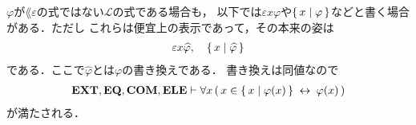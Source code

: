 	\begin{screen}
		\begin{rem}
		\label{rem:epsilon_terms_of_not_L_epsilon_formula}
			$\varphi$が$\lang{\varepsilon}$の式ではない$\mathcal{L}$の式である場合も，
			以下では$\varepsilon x \varphi$や$\{\, x \mid \varphi\, \}$などと書く場合がある．ただし
			これらは便宜上の表示であって，その本来の姿は
			\begin{align}
				\varepsilon x \widehat{\varphi},\quad \{\, x \mid \widehat{\varphi}\, \}
			\end{align}
			である．ここで$\widehat{\varphi}$とは$\varphi$の書き換えである．
			書き換えは同値なので
			\begin{align}
				\mbox{{\bf EXT}},\mbox{{\bf EQ}},\mbox{\bf COM},\mbox{{\bf ELE}} \vdash \forall x\, (\, x \in \{\, x \mid \varphi(x)\, \} \hspace{0.25em}\leftrightarrow\hspace{0.25em} \varphi(x)\, )
			\end{align}
			が満たされる．
		\end{rem}
	\end{screen}